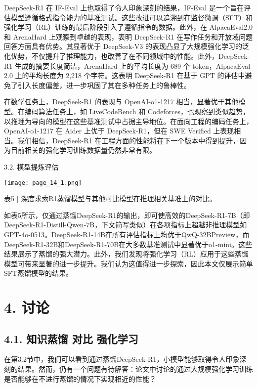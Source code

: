 \documentclass[12pt,a4paper]{report} %
\begin{document}
DeepSeek-R1 在 IF-Eval 上也取得了令人印象深刻的结果，IF-Eval 是一个旨在评估模型遵循格式指令能力的基准测试。这些改进可以追溯到在监督微调（SFT）和强化学习（RL）训练的最后阶段引入了遵循指令的数据。此外，在 AlpacaEval2.0 和 ArenaHard 上观察到卓越的表现，表明 DeepSeek-R1 在写作任务和开放域问题回答方面具有优势。其显著优于 DeepSeek-V3 的表现凸显了大规模强化学习的泛化优势，不仅提升了推理能力，也改善了在不同领域中的性能。此外，DeepSeek-R1 生成的摘要长度简洁，ArenaHard 上的平均长度为 689 个 token，AlpacaEval 2.0 上的平均长度为 2,218 个字符。这表明
DeepSeek-R1 在基于 GPT 的评估中避免了引入长度偏差，进一步巩固了其在多种任务上的鲁棒性。


在数学任务上，DeepSeek-R1 的表现与 OpenAI-o1-1217 相当，显著优于其他模型。在编码算法任务上，如 LiveCodeBench 和 Codeforces，也观察到类似趋势，以推理为导向的模型在这些基准测试中占据主导地位。在面向工程的编码任务上，OpenAI-o1-1217 在 Aider 上优于 DeepSeek-R1，但在 SWE Verified 上表现相当。我们相信，DeepSeek-R1 在工程方面的性能将在下一个版本中得到提升，因为目前相关的强化学习训练数据量仍然非常有限。


3.2. 模型提炼评估


\begin{center}
\texttt{[image: page\_14\_1.png]}
\end{center}
\begin{center}
表5 | 深度求索R1蒸馏模型与其他可比模型在推理相关基准上的对比。
\end{center}






如表5所示，仅通过蒸馏DeepSeek-R1的输出，即可使高效的DeepSeek-R1-7B（即DeepSeek-R1-Distill-Qwen-7B，下文简写类似）在各项指标上超越非推理模型如GPT-4o-0513。DeepSeek-R1-14B在所有评估指标上均优于QwQ-32BPreview，而DeepSeek-R1-32B和DeepSeek-R1-70B在大多数基准测试中显著优于o1-mini。这些结果展示了蒸馏的强大潜力。此外，我们发现将强化学习（RL）应用于这些蒸馏模型可带来显著的进一步提升。我们认为这值得进一步探索，因此本文仅展示简单SFT蒸馏模型的结果。


\section*{4. 讨论}


\subsection*{4.1. 知识蒸馏 对比 强化学习}


在第3.2节中，我们可以看到通过蒸馏DeepSeek-R1，小模型能够取得令人印象深刻的结果。然而，仍有一个问题有待解答：论文中讨论的通过大规模强化学习训练是否能够在不进行蒸馏的情况下实现相近的性能？
\end{document}
